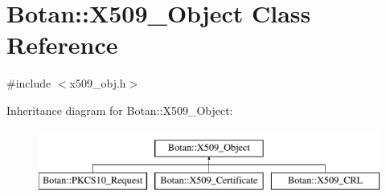 \hypertarget{classBotan_1_1X509__Object}{\section{Botan\-:\-:X509\-\_\-\-Object Class Reference}
\label{classBotan_1_1X509__Object}
}


{\ttfamily \#include $<$x509\-\_\-obj.\-h$>$}

Inheritance diagram for Botan\-:\-:X509\-\_\-\-Object\-:\begin{figure}[H]
\begin{center}
\leavevmode
\includegraphics[height=2.000000cm]{classBotan_1_1X509__Object}
\end{center}
\end{figure}
